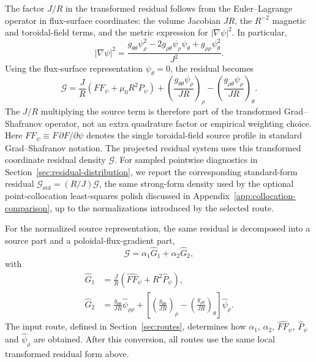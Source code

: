 \documentclass[final, 3p, times]{elsarticle}
\begin{document}
The factor $J/R$ in the transformed residual follows from the Euler--Lagrange operator in flux-surface coordinates: the volume Jacobian $JR$, the $R^{-2}$ magnetic and toroidal-field terms, and the metric expression for $|\nabla\psi|^2$. In particular,
\begin{equation}
    |\nabla\psi|^2
    =\frac{g_{\theta\theta}\psi_\rho^2-2g_{\rho\theta}\psi_\rho\psi_\theta+g_{\rho\rho}\psi_\theta^2}{J^2}.
\end{equation}
Using the flux-surface representation $\psi_\theta=0$, the residual becomes
\begin{equation}
    \mathcal{G}
    = \frac{J}{R}\left(FF_\psi+\mu_0R^2P_\psi\right)
    + \left(\frac{g_{\theta\theta}\psi_\rho}{JR}\right)_\rho
    - \left(\frac{g_{\rho\theta}\psi_\rho}{JR}\right)_\theta .
\end{equation}
The $J/R$ multiplying the source term is therefore part of the transformed Grad--Shafranov operator, not an extra quadrature factor or empirical weighting choice. Here $FF_\psi\equiv F\,\partial F/\partial\psi$ denotes the single toroidal-field source profile in standard Grad--Shafranov notation. The projected residual system uses this transformed coordinate residual density $\mathcal{G}$. For sampled pointwise diagnostics in Section~\ref{sec:residual-distribution}, we report the corresponding standard-form residual $\mathcal{G}_{\mathrm{std}}=(R/J)\mathcal{G}$, the same strong-form density used by the optional point-collocation least-squares polish discussed in Appendix~\ref{app:collocation-comparison}, up to the normalizations introduced by the selected route.

For the normalized source representation, the same residual is decomposed into a source part and a poloidal-flux-gradient part,
\begin{equation}
    \mathcal{G}=\alpha_1\hat{G}_1+\alpha_2\hat{G}_2,
\end{equation}
with
\begin{align}
    \hat{G}_1 & = \frac{J}{R}\left(\hat{FF}_\psi + R^2\hat{P}_\psi\right), \\
    \hat{G}_2 & = \frac{g_{\theta\theta}}{JR}\hat{\psi}_{\rho\rho}
    + \left[\left(\frac{g_{\theta\theta}}{JR}\right)_\rho
        - \left(\frac{g_{\rho\theta}}{JR}\right)_\theta\right]\hat{\psi}_\rho .
\end{align}
The input route, defined in Section~\ref{sec:routes}, determines how $\alpha_1$, $\alpha_2$, $\hat{FF}_\psi$, $\hat{P}_\psi$ and $\hat{\psi}_\rho$ are obtained. After this conversion, all routes use the same local transformed residual form above.
\end{document}
